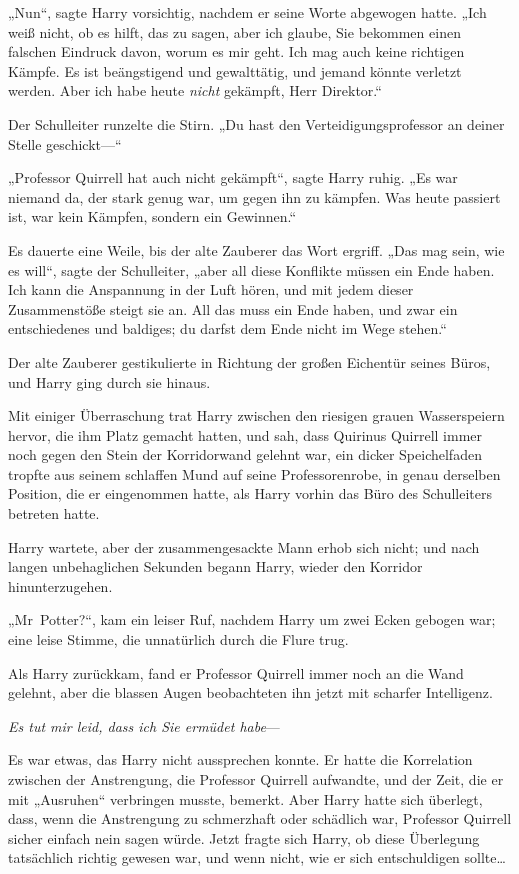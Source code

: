 {„Nun“, sagte Harry vorsichtig, nachdem er seine Worte abgewogen hatte. „Ich weiß nicht, ob es hilft, das zu sagen, aber ich glaube, Sie bekommen einen falschen Eindruck davon, worum es mir geht. Ich mag auch keine richtigen Kämpfe. Es ist beängstigend und gewalttätig, und jemand könnte verletzt werden. Aber ich habe heute \emph{nicht} gekämpft, Herr Direktor.“

Der Schulleiter runzelte die Stirn. „Du hast den Verteidigungsprofessor an deiner Stelle geschickt—“

„Professor Quirrell hat auch nicht gekämpft“, sagte Harry ruhig. „Es war niemand da, der stark genug war, um gegen ihn zu kämpfen. Was heute passiert ist, war kein Kämpfen, sondern ein Gewinnen.“

Es dauerte eine Weile, bis der alte Zauberer das Wort ergriff. „Das mag sein, wie es will“, sagte der Schulleiter, „aber all diese Konflikte müssen ein Ende haben. Ich kann die Anspannung in der Luft hören, und mit jedem dieser Zusammenstöße steigt sie an. All das muss ein Ende haben, und zwar ein entschiedenes und baldiges; du darfst dem Ende nicht im Wege stehen.“

Der alte Zauberer gestikulierte in Richtung der großen Eichentür seines Büros, und Harry ging durch sie hinaus.

Mit einiger Überraschung trat Harry zwischen den riesigen grauen Wasserspeiern hervor, die ihm Platz gemacht hatten, und sah, dass Quirinus Quirrell immer noch gegen den Stein der Korridorwand gelehnt war, ein dicker Speichelfaden tropfte aus seinem schlaffen Mund auf seine Professorenrobe, in genau derselben Position, die er eingenommen hatte, als Harry vorhin das Büro des Schulleiters betreten hatte.

Harry wartete, aber der zusammengesackte Mann erhob sich nicht; und nach langen unbehaglichen Sekunden begann Harry, wieder den Korridor hinunterzugehen.

„Mr~Potter?“, kam ein leiser Ruf, nachdem Harry um zwei Ecken gebogen war; eine leise Stimme, die unnatürlich durch die Flure trug.

Als Harry zurückkam, fand er Professor Quirrell immer noch an die Wand gelehnt, aber die blassen Augen beobachteten ihn jetzt mit scharfer Intelligenz.

\emph{Es tut mir leid, dass ich Sie ermüdet habe}—

Es war etwas, das Harry nicht aussprechen konnte. Er hatte die Korrelation zwischen der Anstrengung, die Professor Quirrell aufwandte, und der Zeit, die er mit „Ausruhen“ verbringen musste, bemerkt. Aber Harry hatte sich überlegt, dass, wenn die Anstrengung zu schmerzhaft oder schädlich war, Professor Quirrell sicher einfach nein sagen würde. Jetzt fragte sich Harry, ob diese Überlegung tatsächlich richtig gewesen war, und wenn nicht, wie er sich entschuldigen sollte…

}
